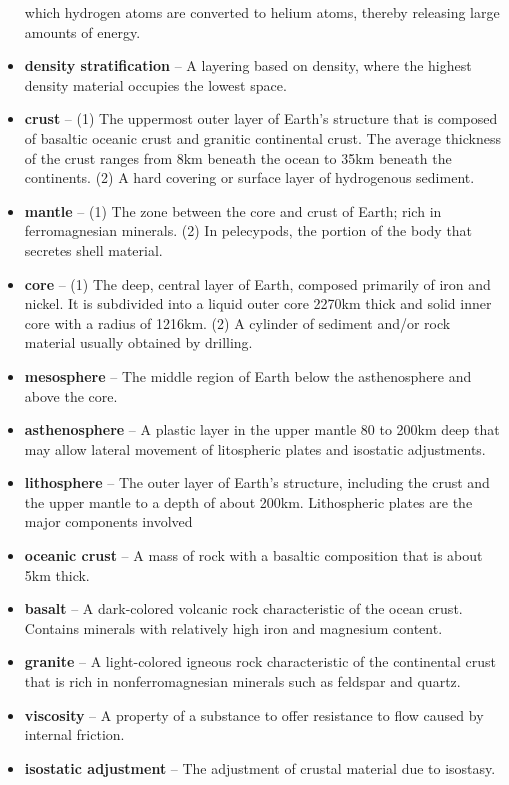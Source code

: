 \begin{itemize}
		which hydrogen atoms are converted to helium atoms, thereby
		releasing large amounts of energy.
	\item \textbf{density stratification} -- A layering based on density,
		where the highest density material occupies the lowest space.
	\item \textbf{crust} -- (1) The uppermost outer layer of Earth's
		structure that is composed of basaltic oceanic crust and
		granitic continental crust. The average thickness of the
		crust ranges from 8km beneath the ocean to 35km beneath the
		continents. (2) A hard covering or surface layer of
		hydrogenous sediment.
	\item \textbf{mantle} -- (1) The zone between the core and crust of
		Earth; rich in ferromagnesian minerals. (2) In pelecypods,
		the portion of the body that secretes shell material.
	\item \textbf{core} -- (1) The deep, central layer of Earth, composed
		primarily of iron and nickel. It is subdivided into a liquid
		outer core 2270km thick and solid inner core with a radius of
		1216km. (2) A cylinder of sediment and/or rock material
		usually obtained by drilling.
	\item \textbf{mesosphere} -- The middle region of Earth below the
		asthenosphere and above the core.
	\item \textbf{asthenosphere} -- A plastic layer in the upper mantle
		80 to 200km deep that may allow lateral movement of
		litospheric plates and isostatic adjustments.
	\item \textbf{lithosphere} -- The outer layer of Earth's structure,
		including the crust and the upper mantle to a depth of about
		200km. Lithospheric plates are the major components involved
	\item \textbf{oceanic crust} -- A mass of rock with a basaltic
		composition that is about 5km thick.
	\item \textbf{basalt} -- A dark-colored volcanic rock characteristic of
		the ocean crust. Contains minerals with relatively high iron
		and magnesium content.
	\item \textbf{granite} -- A light-colored igneous rock characteristic
		of the continental crust that is rich in nonferromagnesian
		minerals such as feldspar and quartz.
	\item \textbf{viscosity} -- A property of a substance to offer
		resistance to flow caused by internal friction.
	\item \textbf{isostatic adjustment} -- The adjustment of crustal
		material due to isostasy.

\end{itemize}

